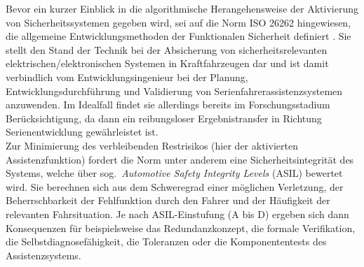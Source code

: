 Bevor ein kurzer Einblick in die algorithmische Herangehensweise der Aktivierung von Sicherheitssystemen gegeben wird, sei auf die Norm ISO 26262 \cite{ISO26262} hingewiesen, die allgemeine Entwicklungsmethoden der Funktionalen Sicherheit definiert  \cite{hillenbrand2011funktionale}. Sie stellt den Stand der Technik bei der Absicherung von sicherheitsrelevanten elektrischen/elektronischen Systemen in Kraftfahrzeugen dar und ist damit verbindlich vom Entwicklungsingenieur bei der Planung, Entwicklungsdurchführung und Validierung von Serienfahrerassistenzsystemen anzuwenden. Im Idealfall findet sie allerdings bereits im Forschungsstadium Berücksichtigung, da dann ein reibungsloser Ergebnistransfer in Richtung Serienentwicklung gewährleistet ist. \\
Zur Minimierung des verbleibenden Restrisikos (hier der aktivierten Assistenzfunktion) fordert die Norm unter anderem eine Sicherheitsintegrität des Systems, welche über sog.\ \emph{Automotive Safety Integrity Levels} (ASIL) bewertet wird. Sie berechnen sich aus dem Schweregrad einer möglichen Verletzung, der Beherrschbarkeit der Fehlfunktion durch den Fahrer und der Häufigkeit der relevanten Fahrsituation. Je nach ASIL-Einstufung (A bis D) ergeben sich dann Konsequenzen für beispielsweise das Redundanzkonzept, die formale Verifikation, die Selbstdiagnosefähigkeit, die Toleranzen oder die Komponententests des Assistenzsystems.

